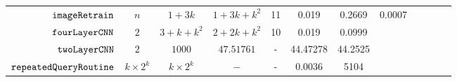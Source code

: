 {\begin {table}[H]
\begin{center}
{\begin{tabular}{| >{\tiny}r | c | c | c | c | c | c | c | c | c | c | c }
         {$\mathtt{imageRetrain}$} & $n$ &  $1 + 3k $ &  $1 + 3k  + k^2$  &  11 & 0.019 & 0.2669  & 0.0007 \\
         $ \mathtt{fourLayerCNN}$ & $2$ &  $3 + k + k^2  $ &  $2 + 2k + k^2  $  &  10 & 0.019 & 0.0999  & \\
         $ \mathtt{twoLayerCNN}$ & $2$ &  $ 1000 $ &  $47.51761$  &  - & 44.47278 & 44.2525  & \\
         $  \mathtt{repeatedQueryRoutine}$ & $ k \times 2^k $ & $  k \times 2^k $ & $- $   &  - & 0.0036 & 5104  & \\
         \hline \hline
        \end{tabular}
}
\end{center}
\end{table}
}


